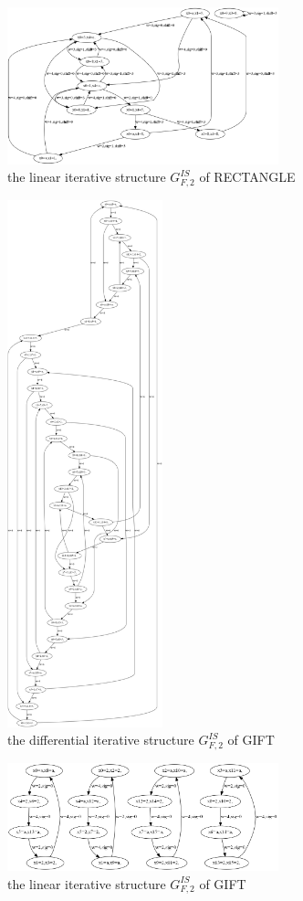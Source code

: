 \begin{figure}
	\centering
	\includegraphics[width=0.7\textwidth]{fig/graph_rect_lat.PNG}
	\caption{the linear iterative structure $G^{IS}_{F,2}$ of RECTANGLE} \label{fig:graph_rect_lat}
\end{figure}

\begin{figure}
	\centering
	\includegraphics[width=0.4\textwidth]{fig/graph_gift_ddt.PNG}
	\caption{the differential iterative structure $G^{IS}_{F,2}$ of GIFT} \label{fig:graph_gift_ddt}
\end{figure}

\begin{figure}
	\centering
	\includegraphics[width=0.7\textwidth]{fig/graph_gift_lat.PNG}
	\caption{the linear iterative structure $G^{IS}_{F,2}$ of GIFT} \label{fig:graph_gift_lat}
\end{figure}
